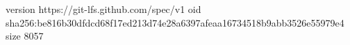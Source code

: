 version https://git-lfs.github.com/spec/v1
oid sha256:be816b30dfdcd68f17ed213d74e28a6397afeaa16734518b9abb3526e55979e4
size 8057
